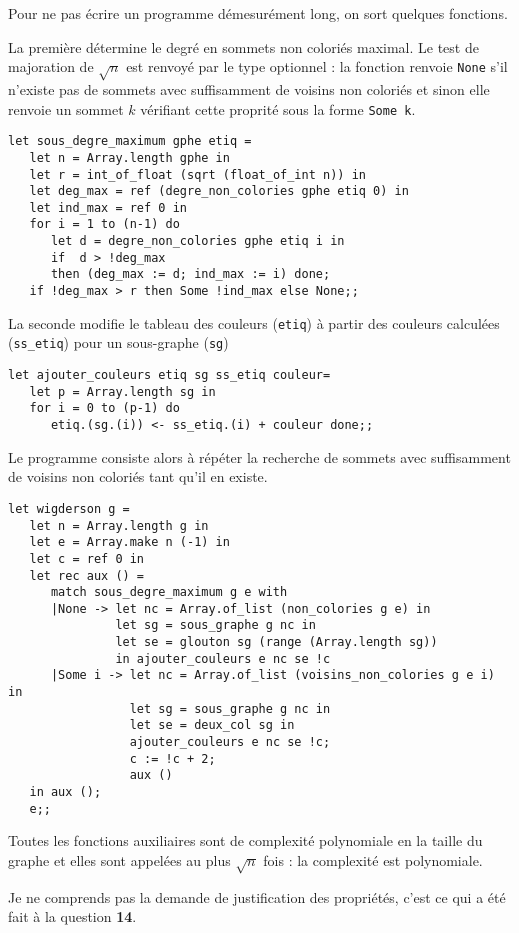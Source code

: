 \begin{Answer}

Pour ne pas écrire un programme démesurément long, on sort quelques fonctions. 

La première détermine le degré en sommets non coloriés maximal. Le test de majoration de $\sqrt n$ est renvoyé par le type optionnel : la fonction renvoie \texttt{None} s'il n'existe pas de sommets avec suffisamment de voisins non coloriés et sinon elle renvoie un sommet $k$ vérifiant cette proprité sous la forme \texttt{Some k}.
\begin{lstlisting}
let sous_degre_maximum gphe etiq =
   let n = Array.length gphe in
   let r = int_of_float (sqrt (float_of_int n)) in
   let deg_max = ref (degre_non_colories gphe etiq 0) in 
   let ind_max = ref 0 in
   for i = 1 to (n-1) do
      let d = degre_non_colories gphe etiq i in
      if  d > !deg_max
      then (deg_max := d; ind_max := i) done;
   if !deg_max > r then Some !ind_max else None;;
\end{lstlisting}

La seconde modifie le tableau des couleurs (\texttt{etiq}) à partir des couleurs calculées  (\texttt{ss\_etiq}) pour un sous-graphe  (\texttt{sg}) 
\begin{lstlisting}
let ajouter_couleurs etiq sg ss_etiq couleur=
   let p = Array.length sg in
   for i = 0 to (p-1) do
      etiq.(sg.(i)) <- ss_etiq.(i) + couleur done;;
\end{lstlisting}

Le programme consiste alors à répéter la recherche de sommets avec suffisamment de voisins non coloriés tant qu'il en existe.
\begin{lstlisting}
let wigderson g =
   let n = Array.length g in
   let e = Array.make n (-1) in
   let c = ref 0 in
   let rec aux () =
      match sous_degre_maximum g e with
      |None -> let nc = Array.of_list (non_colories g e) in
               let sg = sous_graphe g nc in
               let se = glouton sg (range (Array.length sg)) 
               in ajouter_couleurs e nc se !c
      |Some i -> let nc = Array.of_list (voisins_non_colories g e i) in
                 let sg = sous_graphe g nc in
                 let se = deux_col sg in
                 ajouter_couleurs e nc se !c;
                 c := !c + 2;
                 aux ()
   in aux (); 
   e;;
\end{lstlisting}

Toutes les fonctions auxiliaires sont de complexité polynomiale en la taille du graphe et elles sont appelées au plus $\sqrt n$ fois : la complexité est polynomiale.

Je ne comprends pas la demande de justification des propriétés, c'est ce qui a été fait à la question {\bf 14}.
\end{Answer}
